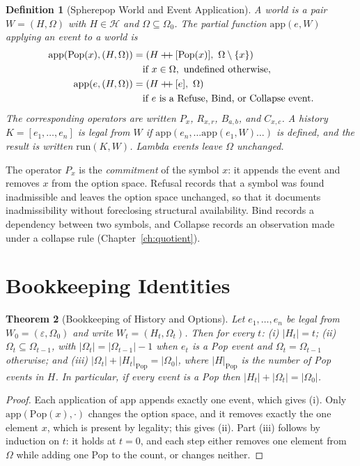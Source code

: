 \documentclass[12pt,oneside,openany]{book}
\theoremstyle{spherepop}
\newtheorem{definition}{Definition}[chapter]
\newtheorem{theorem}[definition]{Theorem}
\theoremstyle{remarkstyle}
\newcommand{\Pop}{\mathrm{Pop}}
\newcommand{\hconcat}{\mathbin{+\mkern-5mu+}}
\newcommand{\calH}{\mathcal{H}}
\newcommand{\npop}[1]{|#1|_{\Pop}}
\begin{document}
\begin{definition}[Spherepop World and Event Application]
\label{def:world}
A \emph{world} is a pair $W=(H,\Omega)$ with $H\in\calH$ and $\Omega\subseteq\Omega_0$. The partial function $\mathrm{app}(e,W)$ applying an event to a world is
\begin{align*}
\mathrm{app}(\Pop(x),(H,\Omega)) &= (H\hconcat[\Pop(x)],\ \Omega\setminus\{x\}) \\ &\quad\text{if } x\in\Omega,\ \text{undefined otherwise},\\
\mathrm{app}(e,(H,\Omega)) &= (H\hconcat[e],\ \Omega) \\ &\quad\text{if } e \text{ is a Refuse, Bind, or Collapse event.}
\end{align*}
The corresponding \emph{operators} are written $P_x$, $R_{x,r}$, $B_{a,b}$, and $C_{x,c}$. A history $K=[e_1,\dots,e_n]$ is \emph{legal} from $W$ if $\mathrm{app}(e_n,\dots\mathrm{app}(e_1,W)\dots)$ is defined, and the result is written $\mathrm{run}(K,W)$. Lambda events leave $\Omega$ unchanged.
\end{definition}

The operator $P_x$ is the \emph{commitment} of the symbol $x$: it appends the event and removes $x$ from the option space. Refusal records that a symbol was found inadmissible and leaves the option space unchanged, so that it documents inadmissibility without foreclosing structural availability. Bind records a dependency between two symbols, and Collapse records an observation made under a collapse rule (Chapter~\ref{ch:quotient}).

\section{Bookkeeping Identities}

\begin{theorem}[Bookkeeping of History and Options]
\label{thm:conservation}
Let $e_1,\dots,e_n$ be legal from $W_0=(\varepsilon,\Omega_0)$ and write $W_t=(H_t,\Omega_t)$. Then for every $t$: (i) $|H_t|=t$; (ii) $\Omega_t\subseteq\Omega_{t-1}$, with $|\Omega_t|=|\Omega_{t-1}|-1$ when $e_t$ is a Pop event and $\Omega_t=\Omega_{t-1}$ otherwise; and (iii) $|\Omega_t|+\npop{H_t}=|\Omega_0|$, where $\npop{H}$ is the number of Pop events in $H$. In particular, if every event is a Pop then $|H_t|+|\Omega_t|=|\Omega_0|$.
\end{theorem}

\begin{proof}
Each application of $\mathrm{app}$ appends exactly one event, which gives (i). Only $\mathrm{app}(\Pop(x),\cdot)$ changes the option space, and it removes exactly the one element $x$, which is present by legality; this gives (ii). Part (iii) follows by induction on $t$: it holds at $t=0$, and each step either removes one element from $\Omega$ while adding one Pop to the count, or changes neither.
\end{proof}
\end{document}
